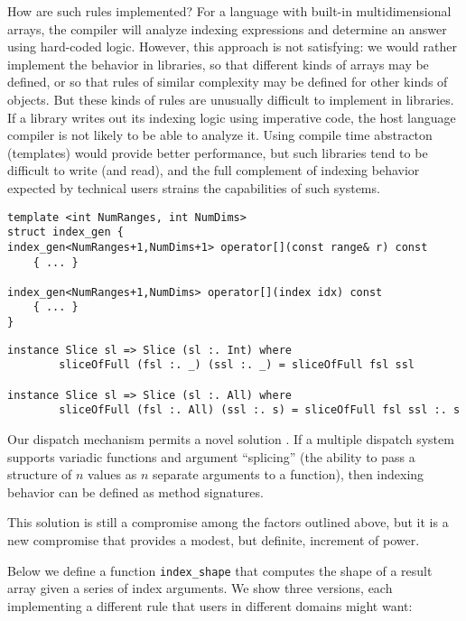 How are such rules implemented? For a
language with built-in multidimensional arrays, the compiler will
analyze indexing expressions and determine an answer using hard-coded
logic.
However, this approach is not satisfying: we would rather
implement the behavior in libraries, so that different kinds of arrays
may be defined, or so that rules of similar complexity may be
defined for other kinds of objects. But these kinds of rules are
unusually difficult to implement in libraries. If a library writes out
its indexing logic using imperative code, the host language compiler
is not likely to be able to analyze it. Using compile time abstracton
(templates) would provide better performance, but such libraries tend
to be difficult to write (and read), and the full complement of
indexing behavior expected by technical users strains the capabilities
of such systems.


\begin{verbatim}
template <int NumRanges, int NumDims>
struct index_gen {
index_gen<NumRanges+1,NumDims+1> operator[](const range& r) const
    { ... }

index_gen<NumRanges+1,NumDims> operator[](index idx) const
    { ... }
}
\end{verbatim}


\begin{verbatim}
instance Slice sl => Slice (sl :. Int) where
        sliceOfFull (fsl :. _) (ssl :. _) = sliceOfFull fsl ssl

instance Slice sl => Slice (sl :. All) where
        sliceOfFull (fsl :. All) (ssl :. s) = sliceOfFull fsl ssl :. s
\end{verbatim}


Our dispatch mechanism permits a novel solution \cite{Bezanson2014}.
If a multiple dispatch
system supports variadic functions and argument ``splicing'' (the ability
to pass a structure of $n$ values as $n$ separate arguments to a function),
then indexing behavior can be defined as method signatures.

This solution is still a compromise among the factors outlined above,
but it is a new compromise that provides a modest, but definite,
increment of power.

Below we define a function \texttt{index\_shape} that computes the
shape of a result array given a series of index arguments. We show
three versions, each implementing a different rule that users in
different domains might want:

